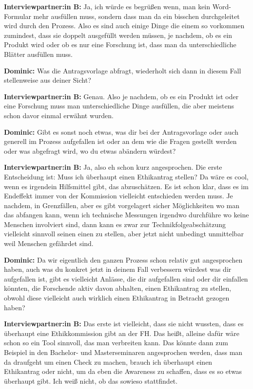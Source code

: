 \documentclass[a4paper,12pt,twoside]{scrreprt}
\begin{document}
\textbf{Interviewpartner:in B:} Ja, ich würde es begrüßen wenn, man kein Word-Formular mehr ausfüllen muss, sondern dass man da ein bisschen durchgeleitet wird durch den Prozess. Also es sind auch einige Dinge die einem so vorkommen zumindest, dass sie doppelt ausgefüllt werden müssen, je nachdem, ob es ein Produkt wird oder ob es nur eine Forschung ist, dass man da unterschiedliche Blätter ausfüllen muss.

\textbf{Dominic:} Was die Antragsvorlage abfragt, wiederholt sich dann in diesem Fall stellenweise aus deiner Sicht?

\textbf{Interviewpartner:in B:} Genau. Also je nachdem, ob es ein Produkt ist oder eine Forschung muss man unterschiedliche Dinge ausfüllen, die aber meistens schon davor einmal erwähnt wurden.

\textbf{Dominic:} Gibt es sonst noch etwas, was dir bei der Antragsvorlage oder auch generell im Prozess aufgefallen ist oder an dem wie die Fragen gestellt werden oder was abgefragt wird, wo du etwas abändern würdest?

\textbf{Interviewpartner:in B:} Ja, also eh schon kurz angesprochen. Die erste Entscheidung ist: Muss ich überhaupt einen Ethikantrag stellen? Da wäre es cool, wenn es irgendein Hilfsmittel gibt, das abzuschätzen. Es ist schon klar, dass es im Endeffekt immer von der Kommission vielleicht entschieden werden muss. Je nachdem, in Grenzfällen, aber es gibt vorgelagert sicher Möglichkeiten wo man das abfangen kann, wenn ich technische Messungen irgendwo durchführe wo keine Menschen involviert sind, dann kann es zwar zur Technikfolgeabschätzung vielleicht sinnvoll seinen einen zu stellen, aber jetzt nicht unbedingt unmittelbar weil Menschen gefährdet sind.

\textbf{Dominic:} Da wir eigentlich den ganzen Prozess schon relativ gut angesprochen haben, auch was du konkret jetzt in deinem Fall verbessern würdest was dir aufgefallen ist, gibt es vielleicht Anlässe, die dir aufgefallen sind oder dir einfallen könnten, die Forschende aktiv davon abhalten, einen Ethikantrag zu stellen, obwohl diese vielleicht auch wirklich einen Ethikantrag in Betracht gezogen haben?

\textbf{Interviewpartner:in B:} Das erste ist vielleicht, dass sie nicht wussten, dass es überhaupt eine Ethikkommission gibt an der FH. Das heißt, alleine dafür wäre schon so ein Tool sinnvoll, das man verbreiten kann. Das könnte dann zum Beispiel in den Bachelor- und Masterseminaren angesprochen werden, dass man da draufgeht um einen Check zu machen, brauch ich überhaupt einen Ethikantrag oder nicht, um da eben die Awareness zu schaffen, dass es so etwas überhaupt gibt. Ich weiß nicht, ob das sowieso stattfindet.
\end{document}
